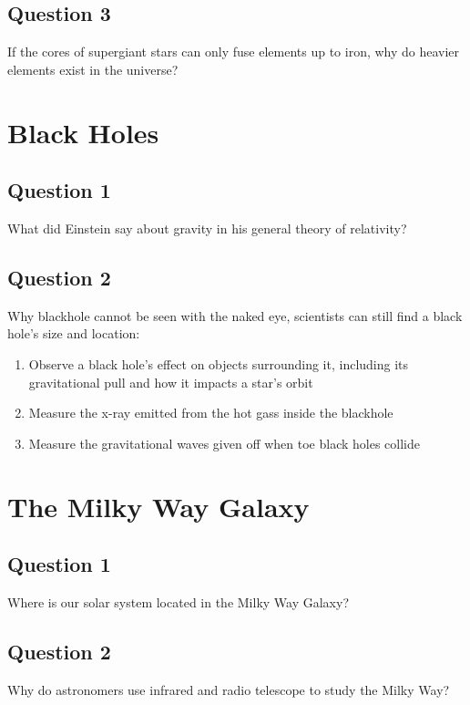 \subsection{Question 3}
If the cores of supergiant stars can only fuse elements up to iron, why do heavier elements exist in the universe?

\section{Black Holes}
\subsection{Question 1}
What did Einstein say about gravity in his general theory of relativity?\\

\subsection{Question 2}
Why blackhole cannot be seen with the naked eye, scientists can still find a black hole's size and location:\\
\begin{enumerate}
    \item Observe a black hole's effect on objects surrounding it, including its gravitational pull and how it impacts a star's orbit
    \item Measure the x-ray emitted from the hot gass inside the blackhole
    \item Measure the gravitational waves given off when toe black holes collide
\end{enumerate}

\section{The Milky Way Galaxy}
\subsection{Question 1}
Where is our solar system located in the Milky Way Galaxy? \\

\subsection{Question 2}
Why do astronomers use infrared and radio telescope to study the Milky Way?\\

